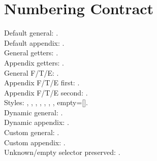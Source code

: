 \section*{Numbering Contract}
Default general: \NCKUDefaultGeneral.\\
Default appendix: \NCKUDefaultAppendix.\\
General getters: \NCKUDefaultGeneralNumbering.\\
Appendix getters: \NCKUDefaultAppendixNumbering.\\
General F/T/E: \NCKUGeneralFTE.\\
Appendix F/T/E first: \NCKUAppendixFTEFirst.\\
Appendix F/T/E second: \NCKUAppendixFTESecond.\\
Styles: \NCKUStyleChiNum, \NCKUStyleTiangan, \NCKUStyleArabic,
\NCKUStyleLowerRoman, \NCKUStyleUpperRoman, \NCKUStyleLowerAlph,
\NCKUStyleUpperAlph, empty=[\NCKUStyleUnknown].\\
Dynamic general: \NCKUDynamicGeneral.\\
Dynamic appendix: \NCKUDynamicAppendix.\\
Custom general: \NCKUCustomGeneral.\\
Custom appendix: \NCKUCustomAppendix.\\
Unknown/empty selector preserved: \NCKUNoopSelector.



